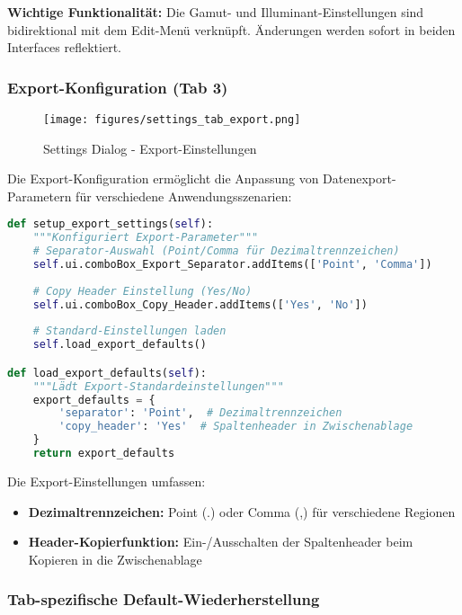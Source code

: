 \textbf{Wichtige Funktionalität:} Die Gamut- und Illuminant-Einstellungen sind bidirektional mit dem Edit-Menü verknüpft. Änderungen werden sofort in beiden Interfaces reflektiert.

\subsubsection{Export-Konfiguration (Tab 3)}

\begin{figure}[H]
    \centering
\texttt{[image: figures/settings\_tab\_export.png]}
\caption{Settings Dialog - Export-Einstellungen}
\label{fig:settings_tab3}
\end{figure}

Die Export-Konfiguration ermöglicht die Anpassung von Datenexport-Parametern für verschiedene Anwendungsszenarien:

\begin{lstlisting}[language=Python, caption=Export-Einstellungen Verwaltung]
def setup_export_settings(self):
    """Konfiguriert Export-Parameter"""
    # Separator-Auswahl (Point/Comma für Dezimaltrennzeichen)
    self.ui.comboBox_Export_Separator.addItems(['Point', 'Comma'])
    
    # Copy Header Einstellung (Yes/No)
    self.ui.comboBox_Copy_Header.addItems(['Yes', 'No'])
    
    # Standard-Einstellungen laden
    self.load_export_defaults()

def load_export_defaults(self):
    """Lädt Export-Standardeinstellungen"""
    export_defaults = {
        'separator': 'Point',  # Dezimaltrennzeichen
        'copy_header': 'Yes'  # Spaltenheader in Zwischenablage
    }
    return export_defaults
\end{lstlisting}

Die Export-Einstellungen umfassen:

\begin{itemize}
    \item \textbf{Dezimaltrennzeichen:} Point (.) oder Comma (,) für verschiedene Regionen
    \item \textbf{Header-Kopierfunktion:} Ein-/Ausschalten der Spaltenheader beim Kopieren in die Zwischenablage
\end{itemize}

\subsubsection{Tab-spezifische Default-Wiederherstellung}

